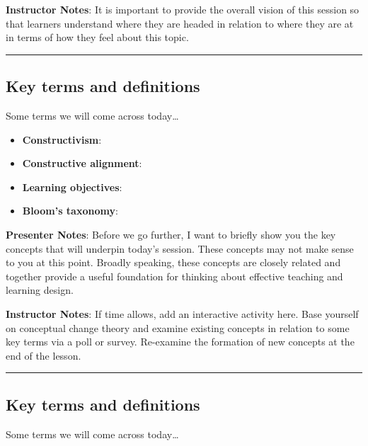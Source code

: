 \documentclass[
  letterpaper,
  DIV=11,
  numbers=noendperiod]{scrartcl}
\providecommand{\tightlist}{%
  \setlength{\itemsep}{0pt}\setlength{\parskip}{0pt}}
\begin{document}
\textbf{Instructor Notes}: It is important to provide the overall vision
of this session so that learners understand where they are headed in
relation to where they are at in terms of how they feel about this
topic.

\begin{center}\rule{0.5\linewidth}{0.5pt}\end{center}

\subsection{Key terms and definitions}\label{key-terms-and-definitions}

Some terms we will come across today\ldots{}

\begin{itemize}
\tightlist
\item
  \textbf{Constructivism}:
\item
  \textbf{Constructive alignment}:
\item
  \textbf{Learning objectives}:
\item
  \textbf{Bloom's taxonomy}:
\end{itemize}

\textbf{Presenter Notes}: Before we go further, I want to briefly show
you the key concepts that will underpin today's session. These concepts
may not make sense to you at this point. Broadly speaking, these
concepts are closely related and together provide a useful foundation
for thinking about effective teaching and learning design.

\textbf{Instructor Notes}: If time allows, add an interactive activity
here. Base yourself on conceptual change theory and examine existing
concepts in relation to some key terms via a poll or survey. Re-examine
the formation of new concepts at the end of the lesson.

\begin{center}\rule{0.5\linewidth}{0.5pt}\end{center}

\subsection{Key terms and
definitions}\label{key-terms-and-definitions-1}

Some terms we will come across today\ldots{}
\end{document}
